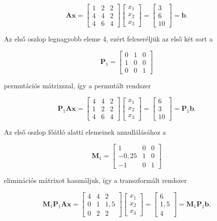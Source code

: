 \documentclass[
  magyar,
  11pt]{article}
\providecommand{\boldsymbol}[1]{\mathbf{#1}}
\begin{document}
\[\boldsymbol{A}\boldsymbol{x} = \begin{bmatrix} 1 & 2 & 2 \\ 4 & 4 & 2 \\ 4 & 6 & 4 \end{bmatrix} \begin{bmatrix} x_1 \\ x_2 \\ x_3 \end{bmatrix} = \begin{bmatrix} 3 \\ 6 \\ 10 \end{bmatrix} = \boldsymbol{b}.\]

Az első oszlop legnagyobb eleme 4, ezért felcseréljük az első két sort a

\[\mathbf{P}_1 = \begin{bmatrix} 0 & 1 & 0 \\ 1 & 0 & 0 \\ 0 & 0 & 1 \end{bmatrix}\]

permutációs mátrixszal, így a permutált rendszer

\[\boldsymbol{P}_{1}\boldsymbol{A}\boldsymbol{x} = \begin{bmatrix} 4 & 4 & 2 \\ 1 & 2 & 2 \\ 4 & 6 & 4 \end{bmatrix} \begin{bmatrix} x_{1} \\ x_{2} \\ x_{3} \end{bmatrix} = \begin{bmatrix} 6 \\ 3 \\ 10 \end{bmatrix} = \boldsymbol{P}_{1}\boldsymbol{b}.\]

Az első oszlop főátló alatti elemeinek annullálásához a

\[\mathbf{M}_1 = \begin{bmatrix} 1 & 0 & 0 \\ -0{,}25 & 1 & 0 \\ -1 & 0 & 1 \end{bmatrix}\]

eliminációs mátrixot használjuk, így a transzformált rendszer

\[\boldsymbol{M}_1\boldsymbol{P}_1\boldsymbol{A}\boldsymbol{x} = \begin{bmatrix} 4 & 4 & 2 \\ 0 & 1 & 1{,}5 \\ 0 & 2 & 2 \end{bmatrix} \begin{bmatrix} x_1 \\ x_2 \\ x_3 \end{bmatrix} = \begin{bmatrix} 6 \\ 1{,}5 \\ 4 \end{bmatrix} = \boldsymbol{M}_1\boldsymbol{P}_1\boldsymbol{b}.\]
\end{document}
